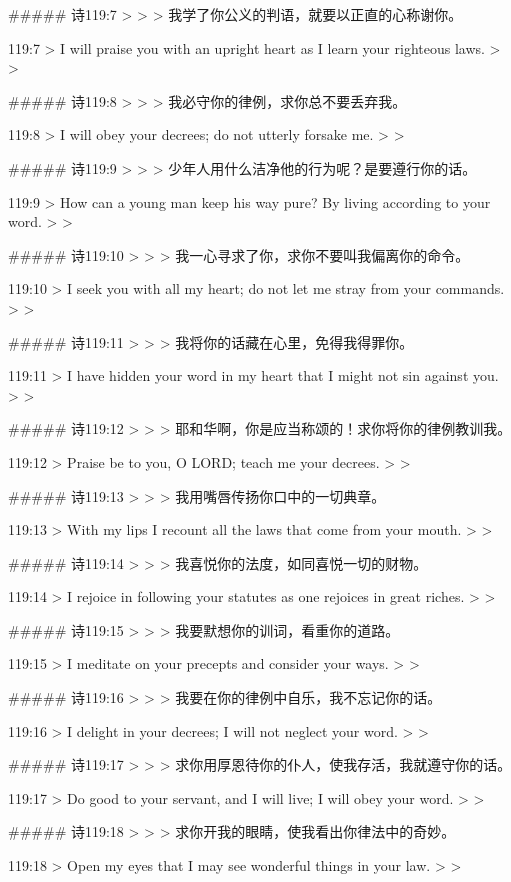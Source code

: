 ##### 诗119:7
> 
>
> 我学了你公义的判语，就要以正直的心称谢你。


119:7
> I will praise you with an upright heart as I learn your righteous laws.
>
> 


##### 诗119:8
> 
>
> 我必守你的律例，求你总不要丢弃我。


119:8
> I will obey your decrees; do not utterly forsake me.
>
> 


##### 诗119:9
> 
>
> 少年人用什么洁净他的行为呢？是要遵行你的话。


119:9
> How can a young man keep his way pure? By living according to your word.
>
> 


##### 诗119:10
> 
>
> 我一心寻求了你，求你不要叫我偏离你的命令。


119:10
> I seek you with all my heart; do not let me stray from your commands.
>
> 


##### 诗119:11
> 
>
> 我将你的话藏在心里，免得我得罪你。


119:11
> I have hidden your word in my heart that I might not sin against you.
>
> 


##### 诗119:12
> 
>
> 耶和华啊，你是应当称颂的！求你将你的律例教训我。


119:12
> Praise be to you, O LORD; teach me your decrees.
>
> 


##### 诗119:13
> 
>
> 我用嘴唇传扬你口中的一切典章。


119:13
> With my lips I recount all the laws that come from your mouth.
>
> 


##### 诗119:14
> 
>
> 我喜悦你的法度，如同喜悦一切的财物。


119:14
> I rejoice in following your statutes as one rejoices in great riches.
>
> 


##### 诗119:15
> 
>
> 我要默想你的训词，看重你的道路。


119:15
> I meditate on your precepts and consider your ways.
>
> 


##### 诗119:16
> 
>
> 我要在你的律例中自乐，我不忘记你的话。


119:16
> I delight in your decrees; I will not neglect your word.
>
> 


##### 诗119:17
> 
>
> 求你用厚恩待你的仆人，使我存活，我就遵守你的话。


119:17
> Do good to your servant, and I will live; I will obey your word.
>
> 


##### 诗119:18
> 
>
> 求你开我的眼睛，使我看出你律法中的奇妙。


119:18
> Open my eyes that I may see wonderful things in your law.
>
> 


